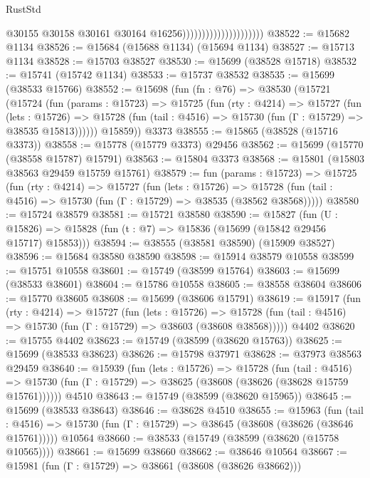 \begin{lexlean}{RustStd}
\begin{coremodule}
                                              @30155
                                              @30158
                                              @30161
                                              @30164
                                              @16256)))))))))))))))))))))
@38522 := @15682 @1134
@38526 := @15684 (@15688 @1134) (@15694 @1134)
@38527 := @15713 @1134
@38528 := @15703 @38527
@38530 := @15699 (@38528 @15718)
@38532 := @15741 (@15742 @1134)
@38533 := @15737 @38532
@38535 := @15699 (@38533 @15766)
@38552 := @15698
    (fun (fn : @76) =>
    @38530
      (@15721
        (@15724
          (fun (params : @15723) =>
          @15725
            (fun (rty : @4214) =>
            @15727
              (fun (lets : @15726) =>
              @15728 (fun (tail : @4516) => @15730 (fun (Γ : @15729) => @38535 @15813))))))
        @15859))
    @3373
@38555 := @15865 (@38528 (@15716 @3373))
@38558 := @15778 (@15779 @3373) @29456
@38562 := @15699 (@15770 (@38558 @15787) @15791)
@38563 := @15804 @3373
@38568 := @15801 (@15803 @38563 @29459 @15759 @15761)
@38579 := fun (params : @15723) =>
  @15725
    (fun (rty : @4214) =>
    @15727
      (fun (lets : @15726) =>
      @15728 (fun (tail : @4516) => @15730 (fun (Γ : @15729) => @38535 (@38562 @38568)))))
@38580 := @15724 @38579
@38581 := @15721 @38580
@38590 := @15827
    (fun (U : @15826) => @15828 (fun (t : @7) => @15836 (@15699 (@15842 @29456 @15717) @15853)))
@38594 := @38555 (@38581 @38590) (@15909 @38527)
@38596 := @15684 @38580 @38590
@38598 := @15914 @38579 @10558
@38599 := @15751 @10558
@38601 := @15749 (@38599 @15764)
@38603 := @15699 (@38533 @38601)
@38604 := @15786 @10558
@38605 := @38558 @38604
@38606 := @15770 @38605
@38608 := @15699 (@38606 @15791)
@38619 := @15917
    (fun (rty : @4214) =>
    @15727
      (fun (lets : @15726) =>
      @15728 (fun (tail : @4516) => @15730 (fun (Γ : @15729) => @38603 (@38608 @38568)))))
    @4402
@38620 := @15755 @4402
@38623 := @15749 (@38599 (@38620 @15763))
@38625 := @15699 (@38533 @38623)
@38626 := @15798 @37971
@38628 := @37973 @38563 @29459
@38640 := @15939
    (fun (lets : @15726) =>
    @15728
      (fun (tail : @4516) =>
      @15730 (fun (Γ : @15729) => @38625 (@38608 (@38626 (@38628 @15759 @15761))))))
    @4510
@38643 := @15749 (@38599 (@38620 @15965))
@38645 := @15699 (@38533 @38643)
@38646 := @38628 @4510
@38655 := @15963
    (fun (tail : @4516) => @15730 (fun (Γ : @15729) => @38645 (@38608 (@38626 (@38646 @15761)))))
    @10564
@38660 := @38533 (@15749 (@38599 (@38620 (@15758 @10565))))
@38661 := @15699 @38660
@38662 := @38646 @10564
@38667 := @15981 (fun (Γ : @15729) => @38661 (@38608 (@38626 @38662)))

\end{coremodule}
\end{lexlean}

